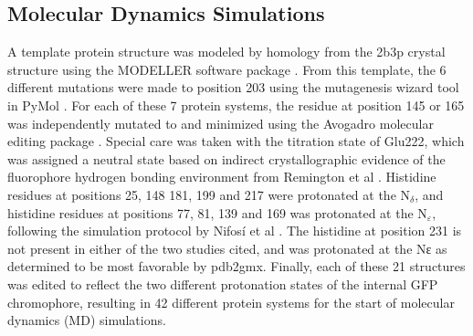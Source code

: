 \subsection{Molecular Dynamics Simulations}

A template protein structure was modeled by homology from the 2b3p crystal structure\cite{Pedelacq2006} using the MODELLER software package \cite{Marti-Renom2000}.
From this template, the 6 different mutations were made to position 203 using the mutagenesis wizard tool in PyMol \cite{DeLano2002}.
For each of these 7 protein systems, the residue at position 145 or 165 was independently mutated to \pCNF{} and minimized using the Avogadro molecular editing package \cite{Hanwell2012}. 
Special care was taken with the titration state of Glu222, which was assigned a neutral state based on indirect crystallographic evidence of the fluorophore hydrogen bonding environment from Remington et al \cite{Elsliger1999}. 
Histidine residues at positions 25, 148 181, 199 and 217 were protonated at the N$_{\delta}$, and histidine residues at positions 77, 81, 139 and 169 was protonated at the N$_{\varepsilon}$, following the simulation protocol by Nifos\'i et al \cite{Nifosi2003}.
The histidine at position 231 is not present in either of the two studies cited, and was protonated at the Nε as determined to be most favorable by pdb2gmx. 
Finally, each of these 21 structures was edited to reflect the two different protonation states of the internal GFP chromophore, resulting in 42 different protein systems for the start of molecular dynamics (MD) simulations. 


